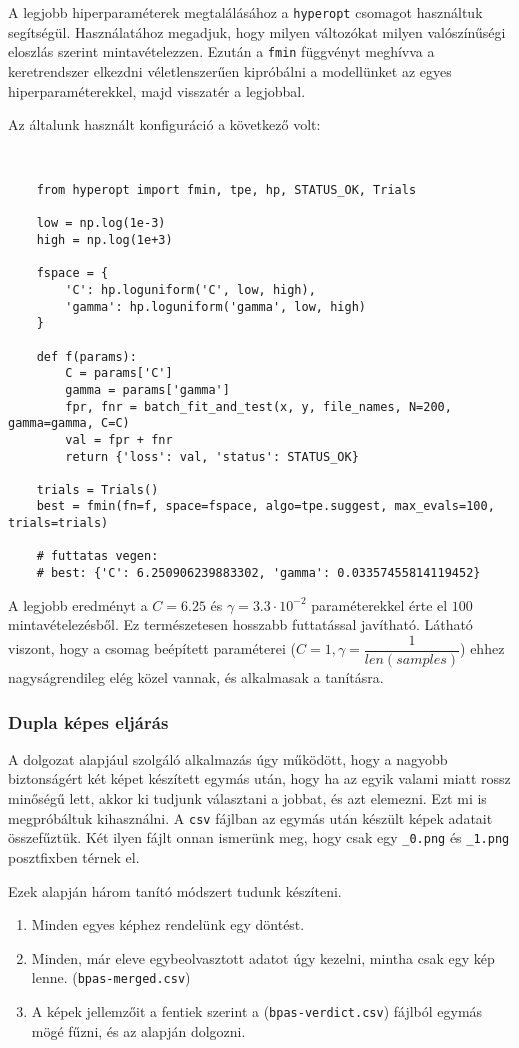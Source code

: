 A legjobb hiperparaméterek megtalálásához a \texttt{hyperopt} \cite{hyperopt} csomagot használtuk
segítségül. Használatához megadjuk, hogy milyen változókat milyen valószínűségi eloszlás szerint
mintavételezzen. Ezután a \texttt{fmin} függvényt meghívva a keretrendszer elkezdni véletlenszerűen
kipróbálni a modellünket az egyes hiperparaméterekkel, majd visszatér a legjobbal. 

Az általunk használt konfiguráció a következő volt:
\begin{lstlisting}


	from hyperopt import fmin, tpe, hp, STATUS_OK, Trials
	
	low = np.log(1e-3)
	high = np.log(1e+3)
	
	fspace = {	
		'C': hp.loguniform('C', low, high),
		'gamma': hp.loguniform('gamma', low, high)
	}
	
	def f(params):
		C = params['C']
		gamma = params['gamma']
		fpr, fnr = batch_fit_and_test(x, y, file_names, N=200, gamma=gamma, C=C)
		val = fpr + fnr
		return {'loss': val, 'status': STATUS_OK}
	
	trials = Trials()
	best = fmin(fn=f, space=fspace, algo=tpe.suggest, max_evals=100, trials=trials)
	
	# futtatas vegen:
	# best: {'C': 6.250906239883302, 'gamma': 0.03357455814119452}
\end{lstlisting}


A legjobb eredményt a $ C=6.25 $ és $ \gamma = 3.3 \cdot 10^{-2} $ paraméterekkel érte el $ 100 $
mintavételezésből. Ez természetesen hosszabb futtatással javítható. Látható viszont, hogy a csomag
beépített paraméterei ($ C=1 , \gamma =\dfrac{1}{len(samples)} $) ehhez nagyságrendileg elég közel vannak,
és alkalmasak a tanításra.


\subsubsection{Dupla képes eljárás}
\label{sec:dupla.kepes.eljaras}

A dolgozat alapjául szolgáló alkalmazás úgy működött, hogy a nagyobb biztonságért két képet készített
egymás után, hogy ha az egyik valami miatt rossz minőségű lett, akkor ki tudjunk választani a jobbat, 
és azt elemezni. Ezt mi is megpróbáltuk kihasználni. A \texttt{csv} fájlban az egymás után készült képek adatait
összefűztük. Két ilyen fájlt onnan ismerünk meg, hogy csak egy \texttt{\_0.png} és \texttt{\_1.png}
posztfixben térnek el.

Ezek alapján három tanító módszert tudunk készíteni. 
\begin{enumerate}
	\item
	Minden egyes képhez rendelünk egy döntést.
	
	\item 
	Minden, már eleve egybeolvasztott adatot úgy kezelni, mintha csak 
	egy kép lenne. (\texttt{bpas-merged.csv})
	
	\item 
	A képek jellemzőit a fentiek szerint a (\texttt{bpas-verdict.csv}) fájlból egymás mögé 
	fűzni, és az alapján dolgozni.
\end{enumerate}


